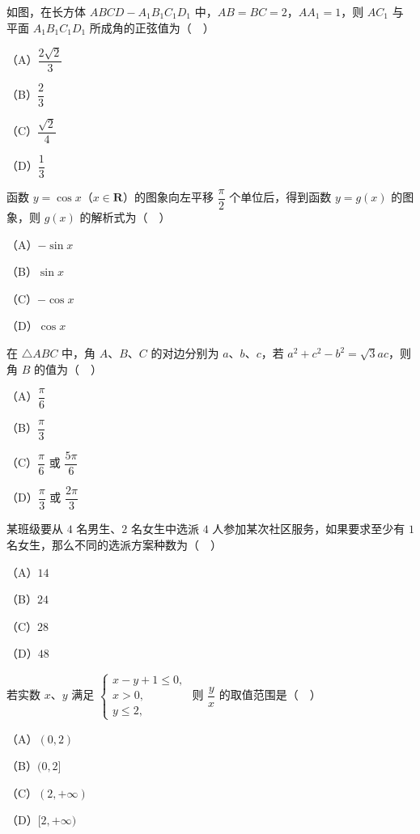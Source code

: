 \begin{question}
如图，在长方体 $ABCD-A_1B_1C_1D_1$ 中，$AB=BC=2$，$AA_1=1$，则 $AC_1$ 与平面 $A_1B_1C_1D_1$ 所成角的正弦值为（　）

（A）$\dfrac{2\sqrt2}{3}$

（B）$\dfrac23$

（C）$\dfrac{\sqrt2}{4}$

（D）$\dfrac13$
\nopagebreak[4]
\begin{center}\end{center}
\nopagebreak[4]
\end{question}
\begin{question}
函数 $y=\cos x$（$x\in\mathbf R$）的图象向左平移 $\dfrac{\pi}{2}$ 个单位后，得到函数 $y=g(x)$ 的图象，则 $g(x)$ 的解析式为（　）

（A）$-\sin x$

（B）$\sin x$

（C）$-\cos x$

（D）$\cos x$

\end{question}
\begin{question}
在 $\triangle ABC$ 中，角 $A$、$B$、$C$ 的对边分别为 $a$、$b$、$c$，若 $a^2+c^2-b^2=\sqrt3ac$，则角 $B$ 的值为（　）

（A）$\dfrac{\pi}{6}$

（B）$\dfrac{\pi}{3}$

（C）$\dfrac{\pi}{6}$ 或 $\dfrac{5\pi}{6}$

（D）$\dfrac{\pi}{3}$ 或 $\dfrac{2\pi}{3}$

\end{question}
\begin{question}
某班级要从 $4$ 名男生、$2$ 名女生中选派 $4$ 人参加某次社区服务，如果要求至少有 $1$ 名女生，那么不同的选派方案种数为（　）

（A）$14$

（B）$24$

（C）$28$

（D）$48$

\end{question}
\begin{question}
若实数 $x$、$y$ 满足 $\begin{cases}x-y+1\leqslant0,\\ x>0,\\ y\leqslant2,\end{cases}$ 则 $\dfrac yx$ 的取值范围是（　）

（A）$(0,2)$

（B）$(0,2]$

（C）$(2,+\infty)$

（D）$[2,+\infty)$

\Needspace{0.4\textheight}
\end{question}
